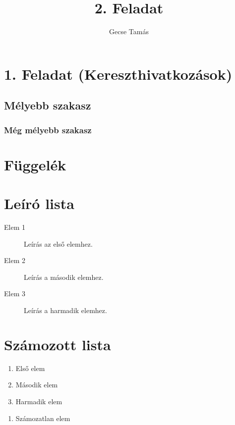 \documentclass[12pt]{article}
\title{2. Feladat}
\author{Gecse Tamás}
\date{}
\begin{document}
\maketitle
\tableofcontents
\newpage

\section{1. Feladat (Kereszthivatkozások)}

\lipsum[1] 
\label{sec:label_zagyva} 
\lipsum[2]
\subsection{Mélyebb szakasz}
\lipsum[3]
\subsubsection{Még mélyebb szakasz}
\label{sec:deep} 
\lipsum[4]

\appendix
\section{Függelék}
\label{sec:appendix}
\lipsum[5]

\section{Leíró lista}
\begin{description}
    \item[Elem 1] \label{desc-item} Leírás az első elemhez.
    \item[Elem 2] Leírás a második elemhez.
    \item[Elem 3] Leírás a harmadik elemhez.
\end{description}

\section{Számozott lista}
\begin{enumerate}
    \item Első elem \label{numbered-item}
    \item Második elem
    \item Harmadik elem
\end{enumerate}

\begin{enumerate}
    \item[] Számozatlan elem \label{unnumbered-item}
\end{enumerate}
\end{document}
